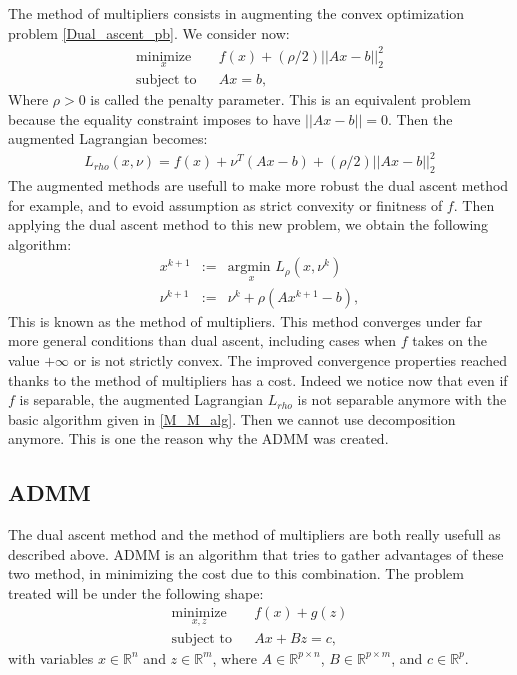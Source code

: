 \documentclass{article}
\begin{document}
	The method of multipliers consists in augmenting the convex optimization problem \ref{Dual_ascent_pb}. We consider now:
\begin{eqnarray}
\label{M_M_pb}
\underset{x}{\text{minimize}} & & f(x) +(\rho/2)||Ax - b||_2^2 \\
\text{subject to} & & Ax = b, \nonumber
\end{eqnarray}
Where $\rho > 0$ is called the penalty parameter. This is an equivalent problem because the equality constraint imposes to have $||Ax - b|| = 0$. Then the augmented Lagrangian becomes:
\begin{eqnarray*}
L_{rho}(x,\nu) = f(x) + \nu^T(Ax - b) + (\rho/2)||Ax - b||_2^2
\end{eqnarray*}
The augmented methods are usefull to make more robust the dual ascent method for example, and to evoid assumption as strict convexity or finitness of $f$. Then applying the dual ascent method to this new problem, we obtain the following algorithm:
\begin{eqnarray}
\label{M_M_alg}
x^{k+1} &:=& \underset{x}{\text{argmin }} L_{\rho}(x, \nu^k) \\
\nu^{k+1} &:=& \nu^k + \rho (A x^{k+1} - b),
\end{eqnarray}
This is known as the method of multipliers. This method converges under far more general conditions than dual ascent, including cases when $f$ takes on the value $+ \infty$ or is not strictly convex. 
The improved convergence properties reached thanks to the method of multipliers has a cost. Indeed we notice now that even if $f$ is separable, the augmented Lagrangian $L_{rho}$ is not separable anymore with the basic algorithm given in \ref{M_M_alg}. Then we cannot use decomposition anymore. This is one the reason why the ADMM was created.


\subsection{ADMM}
	\label{ADMM}
	
	The dual ascent method and the method of multipliers are both really usefull as described above. ADMM is an algorithm that tries to gather advantages of these two method, in minimizing the cost due to this combination. The problem treated will be under the following shape:
\begin{eqnarray}
\label{ADMM_pb}
\underset{x,z}{\text{minimize}} & & f(x) + g(z) \\
\text{subject to} & & Ax + Bz = c, \nonumber
\end{eqnarray}	
with variables $x \in \mathbb{R}^n$ and $z \in \mathbb{R}^m$, where $A \in \mathbb{R}^{p \times n}$, $B \in \mathbb{R}^{p \times m}$, and $c \in \mathbb{R}^{p}$.

 
 

\clearpage
\end{document}
